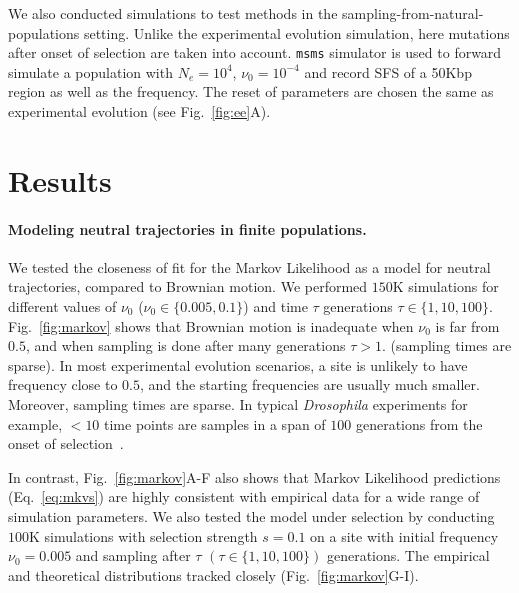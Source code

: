 \documentclass[11pt]{article}
\begin{document}
We also conducted simulations to test methods in the
sampling-from-natural-populations setting. Unlike the experimental
evolution simulation, here mutations after onset of selection are
taken into account.  \texttt{msms} simulator is used to forward
simulate a population with $N_e=10^4$, $\nu_0=10^{-4}$ and record SFS
of a 50Kbp region as well as the frequency. The reset of parameters
are chosen the same as experimental evolution (see
Fig.~\ref{fig:ee}A).



\section{Results}
\paragraph{Modeling neutral trajectories in finite populations.} 
We tested the closeness of fit for the Markov Likelihood as a model
for neutral trajectories, compared to Brownian motion. We performed
$150$K simulations for different values of $\nu_0$
($\nu_0\in\{0.005,0.1\}$) and time $\tau$ generations $\tau\in
\{1,10,100\}$.  Fig.~\ref{fig:markov} shows that Brownian motion is
inadequate when $\nu_0$ is far from $0.5$, and when sampling is done
after many generations $\tau>1$. (sampling times are sparse). In most
experimental evolution scenarios, a site is unlikely to have frequency
close to $0.5$, and the starting frequencies are usually much
smaller. Moreover, sampling times are sparse. In typical
\emph{Drosophila} experiments for example, $<10$ time points are
samples in a span of $100$ generations from the onset of
selection~\cite{orozco2012adaptation, zhou2011experimental}.

In contrast, Fig.~\ref{fig:markov}A-F also shows that Markov
Likelihood predictions (Eq.~\ref{eq:mkvs}) are highly consistent with
empirical data for a wide range of simulation parameters. We also
tested the model under selection by conducting $100$K simulations with
selection strength $s=0.1$ on a site with initial frequency
$\nu_0=0.005$ and sampling after $\tau$ $(\tau\in\{1,10,100\})$
generations. The empirical and theoretical distributions tracked
closely (Fig.~\ref{fig:markov}G-I).
\end{document}
